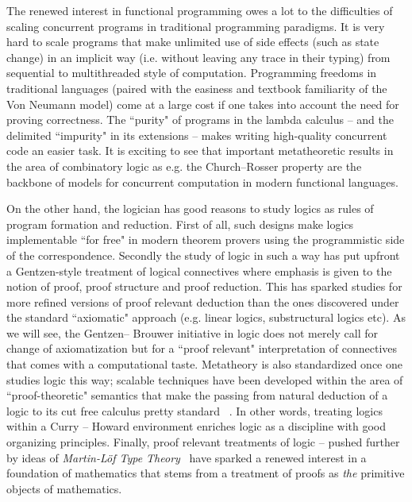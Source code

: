 The renewed interest in functional programming owes a lot to the
 difficulties of scaling concurrent programs in traditional programming paradigms. 
 It is very hard  to scale programs that make unlimited use of side effects 
 (such as state change) in an implicit way (i.e. without leaving any trace in their typing)
  from sequential to  multithreaded style of computation. Programming freedoms in traditional 
  languages (paired with the easiness and textbook familiarity of the Von Neumann model) come 
  at a large cost if one takes into account the need for proving 
  correctness. The ``purity" of
   programs in the lambda calculus -- and the delimited ``impurity" in its extensions -- makes 
   writing high-quality concurrent code an easier task. 
   It is exciting to see that important metatheoretic results in the area of combinatory logic as e.g. the Church--Rosser 
   property are the backbone of models for concurrent computation in modern functional languages. 



On the other hand, the logician has good reasons to study logics as rules of program formation and reduction. First of all, 
such designs make logics implementable ``for free"
in modern theorem provers using the programmistic side of the correspondence. 
Secondly the study of logic in such a way has put upfront a  Gentzen-style treatment of logical 
connectives where emphasis is given to the notion of proof, proof structure and proof reduction. 
This has sparked studies for more refined versions of proof relevant deduction than the ones 
discovered under the standard ``axiomatic" approach (e.g. linear logics, substructural logics etc). 
As we will see, the Gentzen-- Brouwer initiative in  logic  does not merely call for change of 
axiomatization but for a ``proof relevant" interpretation of connectives that comes with a
computational taste. Metatheory is also standardized once one studies logic this way;  
scalable techniques have been developed within the area of ``proof-theoretic" semantics 
that make the passing from  natural deduction of a logic to its cut free calculus pretty standard ~\cite{Sieg1998,pfenning2000structural}. 
In other words, treating logics within a Curry -- Howard environment 
enriches logic as a discipline with good organizing principles. 
Finally, proof relevant treatments of logic -- pushed further by ideas of 
\emph{Martin-L\"{o}f Type Theory}~\cite{martin1984intuitionistic} 
have sparked  a renewed interest in  a foundation of mathematics that stems from 
a  treatment of proofs as \textit{the} primitive objects of mathematics. 


